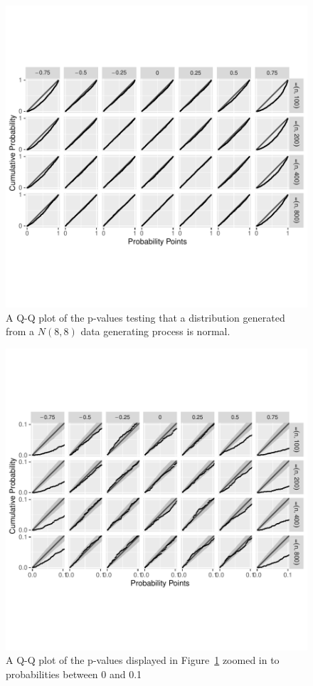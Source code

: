 \documentclass[12pt, titlepage, letterpaper]{article}
\begin{document}
{\begin{figure}[tbp]
  \centering
  \includegraphics[width = \textwidth]{figures/normal}
  \caption{A Q-Q plot of the p-values testing that a distribution
  generated from a $N(8,8)$ data generating process is normal.}
  \label{fig:normal}
\end{figure}

\begin{figure}[tbp]
  \centering
  \includegraphics[width = \textwidth]{figures/zoom_normal}
  \caption{A Q-Q plot of the p-values displayed in Figure~\ref{fig:normal} zoomed in to 
  probabilities between 0 and
  0.1}
  \label{fig:zoom_normal}
\end{figure}

}
\end{document}
